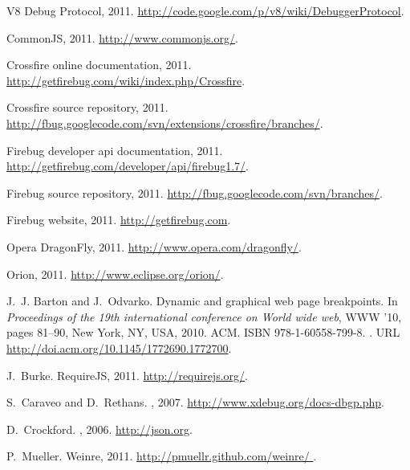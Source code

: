 \documentclass[10pt]{sigplanconf}
\begin{document}
\begin{thebibliography}{27}
V8 {D}ebug {P}rotocol, 2011.
\newblock \url{http://code.google.com/p/v8/wiki/DebuggerProtocol}.

Common{JS}, 2011.
\newblock \url{http://www.commonjs.org/}.

Crossfire online documentation, 2011{}.
\newblock \url{http://getfirebug.com/wiki/index.php/Crossfire}.

Crossfire source repository, 2011{}.
\newblock \url{http://fbug.googlecode.com/svn/extensions/crossfire/branches/}.

Firebug developer api documentation, 2011{}.
\newblock \url{http://getfirebug.com/developer/api/firebug1.7/}.

Firebug source repository, 2011{}.
\newblock \url{http://fbug.googlecode.com/svn/branches/}.

Firebug website, 2011.
\newblock \url{http://getfirebug.com}.

Opera {D}ragon{F}ly, 2011.
\newblock \url{http://www.opera.com/dragonfly/}.

Orion, 2011.
\newblock \url{http://www.eclipse.org/orion/}.

J.~J. Barton and J.~Odvarko.
\newblock Dynamic and graphical web page breakpoints.
\newblock In \emph{Proceedings of the 19th international conference on World
  wide web}, WWW '10, pages 81--90, New York, NY, USA, 2010. ACM.
\newblock ISBN 978-1-60558-799-8.
\newblock {}.
\newblock URL \url{http://doi.acm.org/10.1145/1772690.1772700}.

J.~Burke.
\newblock Require{JS}, 2011.
\newblock \url{http://requirejs.org/}.

S.~Caraveo and D.~Rethans.
, 2007.
\newblock \url{http://www.xdebug.org/docs-dbgp.php}.

D.~Crockford.
, 2006.
\newblock \url{http://json.org}.

P.~Mueller.
\newblock Weinre, 2011.
\newblock \url{http://pmuellr.github.com/weinre/ }.


\end{thebibliography}
\end{document}

